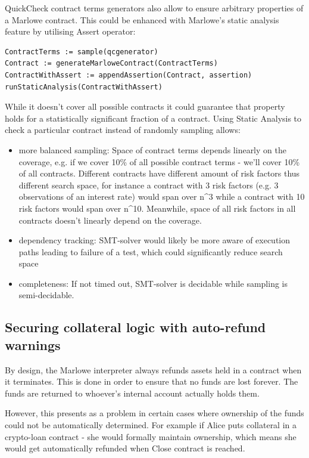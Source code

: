 \documentclass[runningheads]{llncs}
\begin{document}
QuickCheck\cite{qc} contract terms generators also allow to ensure
arbitrary properties of a Marlowe contract. This could be enhanced
with Marlowe's static analysis feature by utilising Assert operator:

\begin{verbatim}
ContractTerms := sample(qcgenerator) 
Contract := generateMarloweContract(ContractTerms) 
ContractWithAssert := appendAssertion(Contract, assertion) 
runStaticAnalysis(ContractWithAssert)
\end{verbatim}

While it doesn't cover all possible contracts it could guarantee that
property holds for a statistically significant fraction of a contract.
Using Static Analysis to check a particular contract instead of randomly
sampling allows: 
\begin{itemize}
\item more balanced sampling: Space of contract terms depends linearly on
the coverage, e.g. if we cover 10\% of all possible contract terms
- we'll cover 10\% of all contracts. Different contracts have different
amount of risk factors thus different search space, for instance a
contract with 3 risk factors (e.g. 3 observations of an interest rate)
would span over n\textasciicircum 3 while a contract with 10 risk
factors would span over n\textasciicircum 10. Meanwhile, space of
all risk factors in all contracts doesn't linearly depend on the coverage. 
\item dependency tracking: SMT-solver would likely be more aware of execution
paths leading to failure of a test, which could significantly reduce
search space 
\item completeness: If not timed out, SMT-solver is decidable while sampling
is semi-decidable. 
\end{itemize}

\subsection{Securing collateral logic with auto-refund warnings}

By design, the Marlowe interpreter always refunds assets held in a
contract when it terminates. This is done in order to ensure that
no funds are lost forever. The funds are returned to whoever's internal
account actually holds them.

However, this presents as a problem in certain cases where ownership
of the funds could not be automatically determined. For example if
Alice puts collateral in a crypto-loan contract - she would formally
maintain ownership, which means she would get automatically refunded
when Close contract is reached.
\end{document}
